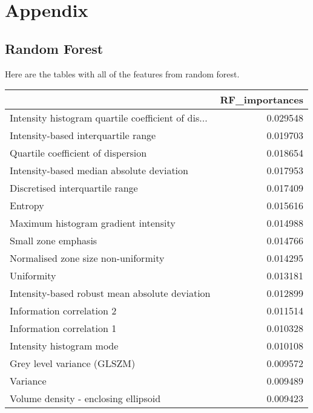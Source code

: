 \chapter{Appendix}

\section{Random Forest}\label{sec:RFAdditional}

Here are the tables with all of the features from random forest.

\centering
\begin{longtable}{|lr|}
{} &  RF\_importances \\
\midrule
Intensity histogram quartile coefficient of dis... &        0.029548 \\
Intensity-based interquartile range                &        0.019703 \\
Quartile coefficient of dispersion                 &        0.018654 \\
Intensity-based median absolute deviation          &        0.017953 \\
Discretised interquartile range                    &        0.017409 \\
Entropy                                            &        0.015616 \\
Maximum histogram gradient intensity               &        0.014988 \\
Small zone emphasis                                &        0.014766 \\
Normalised zone size non-uniformity                &        0.014295 \\
Uniformity                                         &        0.013181 \\
Intensity-based robust mean absolute deviation     &        0.012899 \\
Information correlation 2                          &        0.011514 \\
Information correlation 1                          &        0.010328 \\
Intensity histogram mode                           &        0.010108 \\
Grey level variance (GLSZM)                        &        0.009572 \\
Variance                                           &        0.009489 \\
Volume density - enclosing ellipsoid               &        0.009423 \\

\end{longtable}
